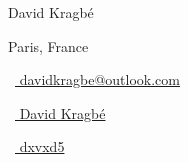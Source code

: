\begin{Large} 
	David Kragbé
\end{Large}

\vspace*{0.25em}

\begin{footnotesize}
	\begin{tiny}\faLocationArrow\end{tiny}{
		 Paris, France
	}
	\quad \begin{tiny}\faEnvelope[regular]\end{tiny}~\href{mailto:davidkragbe@outlook.com}{%
		davidkragbe@outlook.com
	} 
	\quad 
	\quad 
	\begin{tiny}\faLinkedinIn\end{tiny}~\href{https://www.linkedin.com/in/david-kragb%C3%A9-791199165}{
		David Kragbé
	}
	\quad 
	\begin{tiny}\faGithub\end{tiny}~\href{https://github.com/dxvxd5}{
		 dxvxd5
		}
\end{footnotesize}